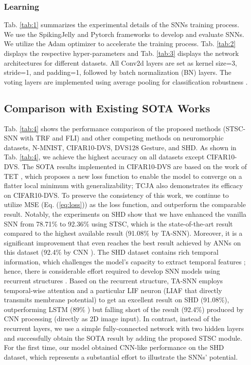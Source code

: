 \documentclass[letterpaper]{article} \usepackage[submission]{aaai23}  \usepackage{times}  \usepackage{helvet}  \usepackage{courier}  \usepackage[hyphens]{url}  \usepackage{graphicx} \urlstyle{rm} \def\UrlFont{\rm}  \usepackage{natbib}  \usepackage{caption} \frenchspacing  \setlength{\pdfpagewidth}{8.5in} \setlength{\pdfpageheight}{11in} \usepackage{algorithm}
\begin{document}
\subsubsection{Learning}
Tab. \ref{tab:1} summarizes the experimental details of the SNNs training process. We use the SpikingJelly \cite{SpikingJelly} and Pytorch \cite{paszke_pytorch_2019} frameworks to develop and evaluate SNNs. We utilize the Adam optimizer \cite{kingma_adam_2017} to accelerate the training process.
Tab. \ref{tab:2} displays the respective hyper-parameters and Tab. \ref{tab:3} displays the network architectures for different datasets. All Conv2d layers are set as kernel size=3, stride=1, and padding=1, followed by batch normalization (BN) layers. The voting layers are implemented using average pooling for classification robustness \cite{fang_incorporating_2021}.

\subsection{Comparison with Existing SOTA Works}
Tab. \ref{tab:4} shows the performance comparison of the proposed methods (STSC-SNN with TRF and FLI) and other competing methods on neuromorphic datasets, N-MNIST, CIFAR10-DVS, DVS128 Gesture, and SHD. As shown in Tab. \ref{tab:4}, we achieve the highest accuracy on all datasets except CIFAR10-DVS. The SOTA results implemented in CIFAR10-DVS are based on the work of TET \cite{deng_temporal_2022}, which proposes a new loss function to enable the model to converge on a flatter local minimum with generalizability; TCJA \cite{zhu_tcja-snn_2022} also demonstrates its efficacy on CIFAR10-DVS. To preserve the consistency of this work, we continue to utilize MSE (Eq. (\ref{eq:loss})) as the loss function, and outperform the comparable result.
Notably, the experiments on SHD show that we have enhanced the vanilla SNN from 78.71\% to 92.36\% using STSC, which is the state-of-the-art result compared to the highest available result (91.08\% by TA-SNN). Moreover, it is a significant improvement that even reaches the best result achieved by ANNs on this dataset (92.4\% by CNN \citep{cramer_heidelberg_2020}). 
The SHD dataset contains rich temporal information, which challenges the model's capacity to extract temporal features \cite{cramer_heidelberg_2020}; hence, there is considerable effort required to develop SNN models using recurrent structures \cite{cramer_heidelberg_2020,yin_effective_2020,perez-nieves_neural_2021,yin_accurate_2021}.
Based on the recurrent structure, TA-SNN employs temporal-wise attention and a particular LIF neuron (LIAF \cite{wu_liaf-net_2021} that directly transmits membrane potential) to get an excellent result on SHD (91.08\%), outperforming LSTM (89\% \cite{cramer_heidelberg_2020}) but falling short of the result (92.4\%) produced by CNN processing (directly as 2D image input).
In contrast, instead of the recurrent layers, we use a simple fully-connected network with two hidden layers and successfully obtain the SOTA result by adding the proposed STSC module. 
For the first time, our model obtained CNN-like performance on the SHD dataset, which represents a substantial effort to illustrate the SNNs' potential.
\end{document}
